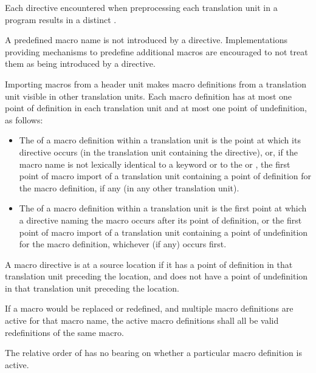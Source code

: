 \pnum
Each  directive encountered when preprocessing
each translation unit in a program results in a distinct
.
\begin{note}
A predefined macro name
is not introduced by a  directive.
Implementations providing mechanisms to predefine additional macros
are encouraged to not treat them
as being introduced by a  directive.
\end{note}
Importing macros from a header unit makes macro definitions
from a translation unit visible in other translation units.
Each macro definition has at most one point of definition in
each translation unit and at most one point of undefinition, as follows:
\begin{itemize}
\item
{}%
The 
of a macro definition within a translation unit
is the point at which its  directive occurs (in the translation
unit containing the  directive), or,
if the macro name is not lexically identical to a keyword
or to the   or ,
the first point
of macro import of a translation unit containing a point of definition for the
macro definition, if any (in any other translation unit).

\item
{}%
The 
of a macro definition within a translation unit
is the first point at which a  directive naming the macro occurs
after its point of definition, or the first point
of macro import of a translation unit containing a point of undefinition for the
macro definition, whichever (if any) occurs first.
\end{itemize}

\pnum
{}%
A macro directive is  at a source location
if it has a point of definition in that translation unit preceding the location,
and does not have a point of undefinition in that translation unit preceding
the location.

\pnum
If a macro would be replaced or redefined, and multiple macro definitions
are active for that macro name, the active macro definitions shall all be
valid redefinitions of the same macro.
\begin{note}
The relative order of  has no bearing on whether a
particular macro definition is active.
\end{note}

